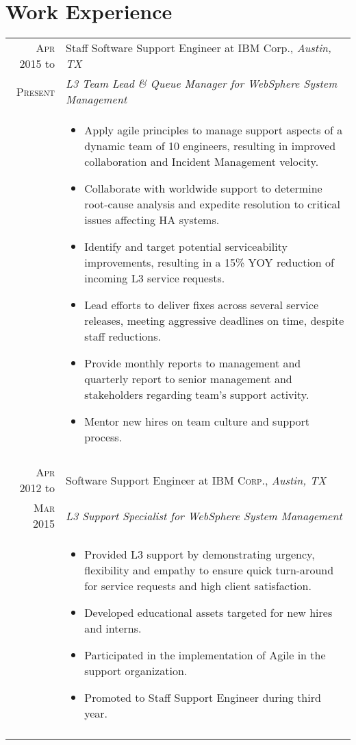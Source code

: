\documentclass[a4paper,10pt]{article}
\begin{document}
\section{Work Experience}
\begin{tabular}{r|p{13cm}}
 \textsc{Apr 2015} \normalsize{to} & \large Staff Software Support Engineer at \textsc{}{IBM Corp.}, \emph{Austin, TX} \\
 \textsc{{Present}}& \emph{L3 Team Lead \& Queue Manager for WebSphere System Management}\\&
 
 \begin{itemize}
 \setlength\itemsep{.5em}
 \item Apply agile principles to manage support aspects of a dynamic team of 10 engineers, resulting in improved collaboration and Incident Management velocity.
 \item Collaborate with worldwide support to determine root-cause analysis and expedite resolution to critical issues affecting HA systems.
 \item Identify and target potential serviceability improvements, resulting in a 15\% YOY reduction of incoming L3 service requests.
 \item Lead efforts to deliver fixes across several service releases,  meeting aggressive deadlines on time, despite staff reductions.
 \item Provide monthly reports to management and quarterly report to senior management and stakeholders regarding team's support activity.
 \item Mentor new hires on team culture and support process.
 \end{itemize} \\
 \multicolumn{2}{c}{} \\
 
 \textsc{Apr 2012} \normalsize{to} & \large Software Support Engineer at \textsc{IBM Corp.}, \emph{Austin, TX} \\
 \textsc{Mar 2015}& \emph{L3 Support Specialist for WebSphere System Management}\\&

 \begin{itemize}
 \setlength\itemsep{.5em}
 \item Provided L3 support by demonstrating urgency, flexibility  and empathy to ensure quick turn-around for service requests and high client satisfaction.
 \item Developed educational assets targeted for new hires and interns.
 \item Participated in the implementation of Agile in the support organization.
 \item Promoted to Staff Support Engineer during third year.
 \end{itemize} \\
 \multicolumn{2}{c}{} \\
 

\end{tabular}
\end{document}
